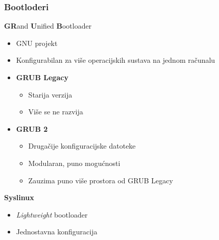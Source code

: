 \documentclass[t]{beamer}
\begin{document}
\begin{frame}
	\frametitle{Bootloderi}
	\textbf{GR}and \textbf{U}nified \textbf{B}ootloader
	\begin{itemize}
		\item GNU projekt
		\item Konfigurabilan za više operacijskih sustava na jednom računalu
	\end{itemize}
	\begin{itemize}
		\item \textbf{GRUB Legacy}
		\begin{itemize}
			\item Starija verzija
			\item Više se ne razvija
		\end{itemize}
		\item \textbf{GRUB 2}
		\begin{itemize}
			\item Drugačije konfiguracijske datoteke
			\item Modularan, puno mogućnosti
			\item Zauzima puno više prostora od GRUB Legacy
		\end{itemize}
	\end{itemize}
	\vfill
	\textbf{Syslinux}
	\begin{itemize}
		\item \emph{Lightweight} bootloader
		\item Jednostavna konfiguracija
	\end{itemize}
\end{frame}
\end{document}
